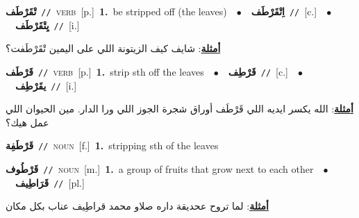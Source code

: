 \documentclass[10pt,a4paper,twoside]{article} %
\begin{document}
\begin{multicols}{2}
{\setlength\topsep{0pt}\textbf{\foreignlanguage{arabic}{تْقَرْطَف}}\ {\color{gray}\texttt{//}\color{black}}\ \textsc{verb}\ [p.]\ \textbf{1.}~be stripped off (the leaves)\ \ $\bullet$\ \ \setlength\topsep{0pt}\textbf{\foreignlanguage{arabic}{اِتْقَرْطَف}}\ {\color{gray}\texttt{//}\color{black}}\ [c.]\ \ $\bullet$\ \ \setlength\topsep{0pt}\textbf{\foreignlanguage{arabic}{يِتْقَرْطَف}}\ {\color{gray}\texttt{//}\color{black}}\ [i.]\  \begin{flushright}\color{gray}\foreignlanguage{arabic}{\textbf{\underline{\foreignlanguage{arabic}{أمثلة}}}: شايف كيف الزيتونة اللي على اليمين تْقَرْطَفت؟}\end{flushright}\color{black}} \vspace{2mm}

{\setlength\topsep{0pt}\textbf{\foreignlanguage{arabic}{قَرْطَف}}\ {\color{gray}\texttt{//}\color{black}}\ \textsc{verb}\ [p.]\ \textbf{1.}~strip sth off the leaves\ \ $\bullet$\ \ \setlength\topsep{0pt}\textbf{\foreignlanguage{arabic}{قَرْطِف}}\ {\color{gray}\texttt{//}\color{black}}\ [c.]\ \ $\bullet$\ \ \setlength\topsep{0pt}\textbf{\foreignlanguage{arabic}{يقَرْطِف}}\ {\color{gray}\texttt{//}\color{black}}\ [i.]\  \begin{flushright}\color{gray}\foreignlanguage{arabic}{\textbf{\underline{\foreignlanguage{arabic}{أمثلة}}}: الله يكسر ايديه اللي قَرْطَف أوراق شجرة الجوز اللي ورا الدار. مين الحيوان اللي عمل هيك؟}\end{flushright}\color{black}} \vspace{2mm}

{\setlength\topsep{0pt}\textbf{\foreignlanguage{arabic}{قَرْطَفِة}}\ {\color{gray}\texttt{//}\color{black}}\ \textsc{noun}\ [f.]\ \textbf{1.}~stripping sth of the leaves\ } \vspace{2mm}

{\setlength\topsep{0pt}\textbf{\foreignlanguage{arabic}{قَرْطُوف}}\ {\color{gray}\texttt{//}\color{black}}\ \textsc{noun}\ [m.]\ \textbf{1.}~a group of fruits that grow next to each other\ \ $\bullet$\ \ \setlength\topsep{0pt}\textbf{\foreignlanguage{arabic}{قَرَاطِيف}}\ {\color{gray}\texttt{//}\color{black}}\ [pl.]\  \begin{flushright}\color{gray}\foreignlanguage{arabic}{\textbf{\underline{\foreignlanguage{arabic}{أمثلة}}}: لما تروح عحديقة داره صلاو محمد قراطِيف عناب بكل مكان}\end{flushright}\color{black}} \vspace{2mm}


\end{multicols}
\end{document}
